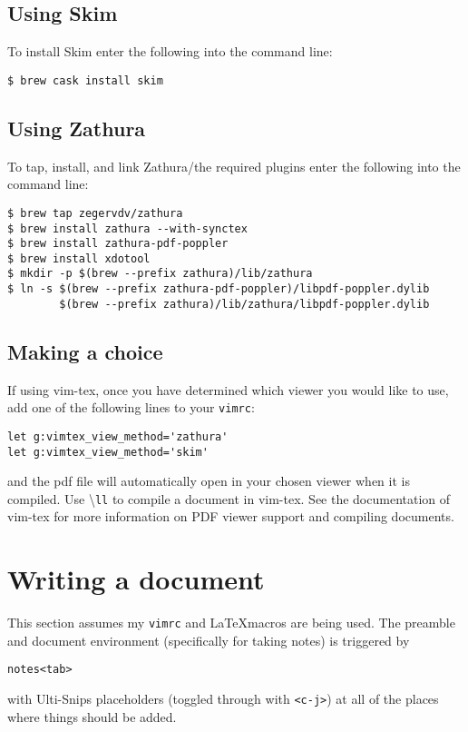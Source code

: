 \documentclass{amsart}
\begin{document}
\subsection{Using Skim}

To install Skim enter the following into the command line:
\begin{center}
\begin{verbatim}
$ brew cask install skim
\end{verbatim}
\end{center}

\subsection{Using Zathura}

To tap, install, and link Zathura/the required plugins 
enter the following into the command line:
\begin{center}
\begin{verbatim}
$ brew tap zegervdv/zathura
$ brew install zathura --with-synctex
$ brew install zathura-pdf-poppler
$ brew install xdotool
$ mkdir -p $(brew --prefix zathura)/lib/zathura
$ ln -s $(brew --prefix zathura-pdf-poppler)/libpdf-poppler.dylib 
        $(brew --prefix zathura)/lib/zathura/libpdf-poppler.dylib
\end{verbatim}
\end{center}

\subsection{Making a choice}

If using vim-tex, once you have determined which viewer you would like to use, add one of the following
lines to your \texttt{vimrc}:
\begin{verbatim}
let g:vimtex_view_method='zathura'
let g:vimtex_view_method='skim'
\end{verbatim}
and the pdf file will automatically open in your chosen viewer when it is compiled.
Use \textbackslash\texttt{ll} to compile a document in vim-tex.
See the documentation of vim-tex for more information on PDF viewer support and compiling
documents.

\section{Writing a document}

This section assumes my \texttt{vimrc} and \LaTeX macros are being used.
The preamble and document environment (specifically for taking notes) is triggered by
\begin{verbatim}
notes<tab>
\end{verbatim}
with Ulti-Snips placeholders (toggled through with \texttt{<c-j>}) 
at all of the places where things should be added. 
\end{document}
